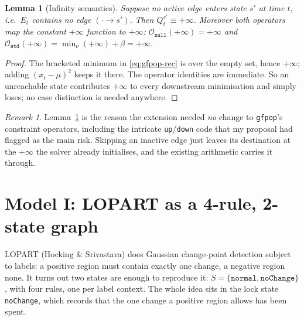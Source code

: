 \documentclass[11pt]{article}
\theoremstyle{definition}
\theoremstyle{plain}
\newtheorem{lemma}[definition]{Lemma}
\theoremstyle{remark}
\newtheorem{remark}[definition]{Remark}
\newcommand{\Op}{\mathcal{O}}
\begin{document}
\begin{lemma}[Infinity semantics]\label{lem:inf}
Suppose no active edge enters state $s'$ at time $t$, i.e.\ $E_t$ contains no
edge $(\cdot\to s')$. Then $Q_t^{s'}\equiv+\infty$. Moreover both operators map
the constant $+\infty$ function to $+\infty$:
$\Op_{\texttt{null}}(+\infty)=+\infty$ and
$\Op_{\texttt{std}}(+\infty)=\min_\nu(+\infty)+\beta=+\infty$.
\end{lemma}
\begin{proof}
The bracketed minimum in \eqref{eq:gfpop-rec} is over the empty set, hence
$+\infty$; adding $(x_t-\mu)^2$ keeps it there. The operator identities are
immediate. So an unreachable state contributes $+\infty$ to every downstream
minimisation and simply loses; no case distinction is needed anywhere.
\end{proof}

\begin{remark}
Lemma~\ref{lem:inf} is the reason the extension needed \emph{no} change to
\texttt{gfpop}'s constraint operators, including the intricate
\texttt{up}/\texttt{down} code that my proposal had flagged as the main risk.
Skipping an inactive edge just leaves its destination at the $+\infty$ the
solver already initialises, and the existing arithmetic carries it through.
\end{remark}

\section{Model I: LOPART as a 4-rule, 2-state graph}\label{sec:lopart}

LOPART (Hocking \& Srivastava) does Gaussian change-point detection subject to
labels: a positive region must contain exactly one change, a negative region
none. It turns out two states are enough to reproduce it:
$S=\{\texttt{normal},\texttt{noChange}\}$, with four rules, one per label
context. The whole idea sits in the lock state \texttt{noChange}, which records
that the one change a positive region allows has been spent.
\end{document}
